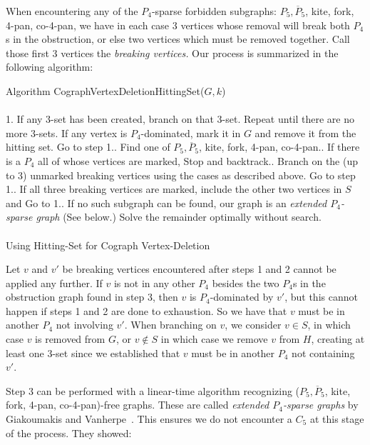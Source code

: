 \documentclass{llncs}
\begin{document}
When encountering any of the $P_4$-sparse forbidden subgraphs: $P_5, \overline{P}_5$, kite, fork, 4-pan, co-4-pan, we have in each case 3 vertices whose removal will break both $P_4$s in the obstruction, or else two vertices which must be removed together. Call those first 3 vertices the \emph{breaking vertices.} Our process is summarized in the following algorithm:\\


\begin{algorithm}[H]
\SetAlgoLined Algorithm {\sc CographVertexDeletionHittingSet($G,k$)}\\
\ \\
1. If any 3-set has been created, branch on that 3-set. Repeat until there are no more 3-sets. If any vertex is $P_4$-dominated, mark it in $G$ and remove it from the hitting set. Go to step 1.. Find one of $P_5, \overline{P}_5$, kite, fork, 4-pan, co-4-pan.. If there is a $P_4$ all of whose vertices are marked, {\sc Stop} and backtrack.. Branch on the (up to 3) unmarked breaking vertices using the cases as described above. Go to step 1.. If all three breaking vertices are marked, include the other two vertices in $S$ and Go to 1.. If no such subgraph can be found, our graph is an \emph{extended $P_4$-sparse graph} (See below.) Solve the remainder optimally without search.\\
\ \\
\caption{Using Hitting-Set for Cograph Vertex-Deletion}
\label{alg:cographVertexHittingSet}
\end{algorithm}

Let $v$ and $v'$ be breaking vertices encountered after steps 1 and 2 cannot be applied any further. If $v$ is not in any other $P_4$ besides the two $P_4$s in the obstruction graph found in step 3, then $v$ is $P_4$-dominated by $v'$, but this cannot happen if steps 1 and 2 are done to exhaustion. So we have that $v$ must be in another $P_4$ not involving $v'$. When branching on $v$, we consider $v \in S$, in which case $v$ is removed from $G$, or $v \notin S$ in which case we remove $v$ from $H$, creating at least one 3-set since we established that $v$ must be in another $P_4$ not containing $v'$.

Step 3 can be performed with a linear-time algorithm recognizing ($P_5, \overline{P}_5$, kite, fork, 4-pan, co-4-pan)-free graphs. These are called \emph{extended $P_4$-sparse graphs} by Giakoumakis and Vanherpe~\cite{GV}. This ensures we do not encounter a $C_5$ at this stage of the process. They showed:
\end{document}
